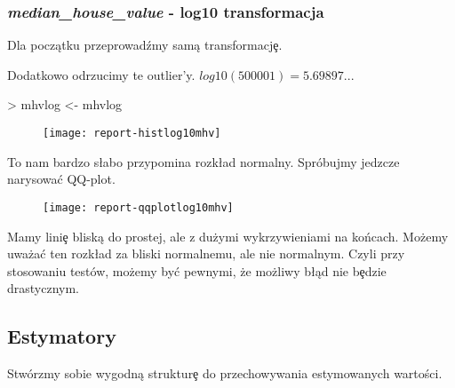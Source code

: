 \documentclass{article}
\begin{document}
\subsubsection{\textit{median\_house\_value} - log10 transformacja}
\quad Dla początku przeprowadźmy samą transformacj\c e.

\begin{Schunk}
\end{Schunk}

\noindent
\quad Dodatkowo odrzucimy te outlier'y. $log10(500001) = 5.69897...$

\begin{Schunk}
\begin{Sinput}
> mhvlog <- mhvlog %>% filter(d < 5.698)
\end{Sinput}
\end{Schunk}

\newpage
\begin{figure}[h!]
\centering
\begin{Schunk}
\end{Schunk}
\texttt{[image: report-histlog10mhv]}
\end{figure}

\noindent
\quad To nam bardzo s\l abo przypomina rozk\l ad normalny. Spróbujmy jedzcze narysowa\'c QQ-plot.

\newpage
\begin{figure}[h!]
\centering
\texttt{[image: report-qqplotlog10mhv]}
\end{figure}

\noindent
\quad Mamy lini\c e bliską do prostej, ale z dużymi wykrzywieniami na końcach. Możemy uważa\'c ten rozk\l ad za bliski normalnemu, ale nie normalnym. Czyli przy stosowaniu testów, możemy by\'c pewnymi, że możliwy b\l ąd nie b\c edzie drastycznym.

\subsection{Estymatory}
\quad Stwórzmy sobie wygodną struktur\c e do przechowywania estymowanych wartości.
\end{document}
